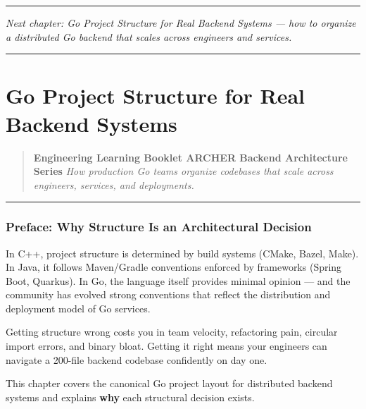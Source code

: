 \documentclass[11pt,openany]{book}
\begin{document}
\begin{center}\rule{0.5\linewidth}{0.5pt}\end{center}

\emph{Next chapter: Go Project Structure for Real Backend Systems ---
how to organize a distributed Go backend that scales across engineers
and services.}

\begin{center}\rule{0.5\linewidth}{0.5pt}\end{center}

\hypertarget{chapter-02-go-project-structure-for-real-backend-systems}{%
\chapter{Go Project Structure for Real Backend
Systems}\label{chapter-02-go-project-structure-for-real-backend-systems}}

\begin{quote}
\textbf{Engineering Learning Booklet \textbar{} ARCHER Backend
Architecture Series} \emph{How production Go teams organize codebases
that scale across engineers, services, and deployments.}
\end{quote}

\begin{center}\rule{0.5\linewidth}{0.5pt}\end{center}

\hypertarget{preface-why-structure-is-an-architectural-decision}{%
\subsection{Preface: Why Structure Is an Architectural
Decision}\label{preface-why-structure-is-an-architectural-decision}}

In C++, project structure is determined by build systems (CMake, Bazel,
Make). In Java, it follows Maven/Gradle conventions enforced by
frameworks (Spring Boot, Quarkus). In Go, the language itself provides
minimal opinion --- and the community has evolved strong conventions
that reflect the distribution and deployment model of Go services.

Getting structure wrong costs you in team velocity, refactoring pain,
circular import errors, and binary bloat. Getting it right means your
engineers can navigate a 200-file backend codebase confidently on day
one.

This chapter covers the canonical Go project layout for distributed
backend systems and explains \textbf{why} each structural decision
exists.
\end{document}
